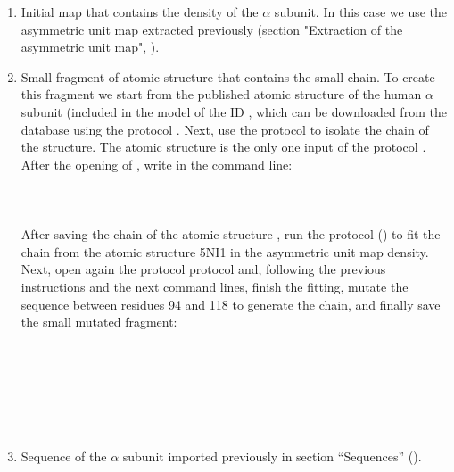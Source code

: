   \begin{enumerate}
  \item Initial map that contains the density of the  $\alpha$ subunit. In this case we use the  asymmetric unit map extracted previously (section "Extraction of the asymmetric unit map", ).
  \item Small fragment of atomic structure that contains the  small chain. To create this fragment we start from the published atomic structure of the human  $\alpha$ subunit (included in the model of the  ID , which can be downloaded from the database using the protocol . Next, use the protocol \chimera {} to isolate the chain  of the structure. The atomic structure  is the only one input of the protocol \chimera {}. After the opening of \chimera, write in the command line:\\
  \\
  \\
  \\
  
  After saving the chain  of the atomic structure , run the protocol  () to fit the chain  from the atomic structure 5NI1 in the  asymmetric unit map density. Next, open again the protocol \chimera {} protocol and, following the previous instructions and the next \chimera command lines, finish the fitting, mutate the sequence between residues 94 and 118 to generate the  chain, and finally save the small mutated fragment:\\
  
  \\
  \\
  \\
  \\
  \\
  \\
  
  \item Sequence of the  $\alpha$ subunit imported previously in section ``Sequences'' ().
  \end{enumerate}
  
